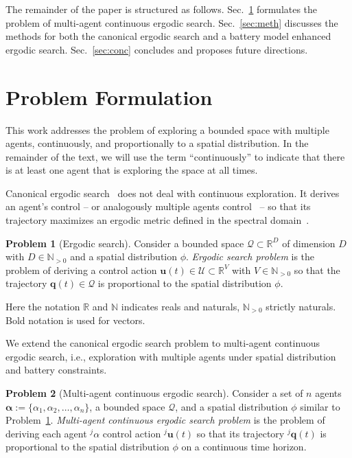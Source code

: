 \documentclass[lettersize,journal,twoside]{IEEEtran}
\theoremstyle{definition}
\newtheorem{pb}{Problem}[section]
\begin{document}
The remainder of the paper is structured as follows. Sec.~\ref{sec:pb} formulates the problem of multi-agent continuous ergodic search. Sec.~\ref{sec:meth} discusses the methods for both the canonical ergodic search and a battery model enhanced ergodic search. Sec.~\ref{sec:conc} concludes and proposes future directions.


\section{Problem Formulation}\label{sec:pb}
\IEEEpubidadjcol
\noindent
This work addresses the problem of exploring a bounded space with multiple agents, continuously, and proportionally to a spatial distribution. 
In the remainder of the text, we will use the term ``continuously'' to indicate that there is at least one agent that is exploring the space at all times.

Canonical ergodic search~\cite{mathew2011metrics,miller2013trajectory,abraham2021ergodic,miller2016ergodic,dressel2018optimality,torre2016ergodic,shetty2022ergodic} does not deal with continuous exploration. It derives an agent's control -- or analogously multiple agents control~\cite{prabhakar2020ergodic,coffin2022multi,lerch2023safety,abraham2018decentralized,patel2021multi} -- so that its trajectory maximizes an ergodic metric defined in the spectral domain~\cite{calinon2020mixture}.

\begin{pb}[Ergodic search]\label{pb:ergo}
  Consider a bounded space $\mathcal{Q}\subset\mathbb{R}^D$ of dimension $D$ with $D\in\mathbb{N}_{>0}$ and a spatial distribution $\phi$. \textit{Ergodic search problem} is the problem of deriving a control action $\mathbf{u}(t)\in\mathcal{U}\subset\mathbb{R}^V$ with $V\in\mathbb{N}_{>0}$ so that the trajectory $\mathbf{q}(t)\in\mathcal{Q}$ is proportional to the spatial distribution $\phi$.
\end{pb}

Here the notation $\mathbb{R}$ and $\mathbb{N}$ indicates reals and naturals, $\mathbb{N}_{>0}$ strictly naturals. Bold notation is used for vectors.

We extend the canonical ergodic search problem to multi-agent continuous ergodic search, i.e., exploration with multiple agents under spatial distribution and battery constraints.

\begin{pb}[Multi-agent continuous ergodic search]\label{pb:enerergo}
  Consider a set of $n$ agents $\boldsymbol{\alpha}:=\{\alpha_1,\alpha_2,\dots,\alpha_n\}$, a bounded space $\mathcal{Q}$, and a spatial distribution $\phi$ similar to Problem~\ref{pb:ergo}. \textit{Multi-agent continuous ergodic search problem} is the problem of deriving each agent ${}^j\alpha$ control action ${}^j\mathbf{u}(t)$ so that its trajectory ${}^j\mathbf{q}(t)$ is proportional to the spatial distribution $\phi$ on a continuous time horizon.
\end{pb}
\end{document}
